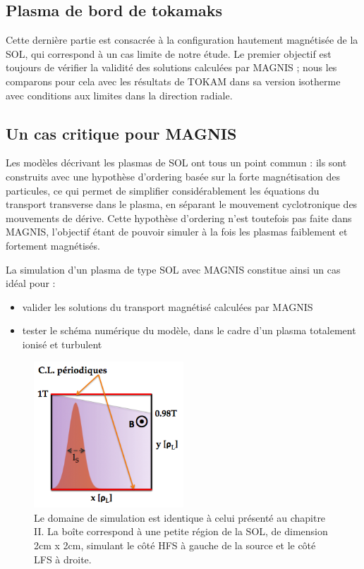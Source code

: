 \begin{refsection}
\section{Plasma de bord de tokamaks}

Cette dernière partie est consacrée à la configuration hautement magnétisée
de la SOL, qui correspond à un cas limite de notre étude. Le premier objectif
est toujours de vérifier la validité des solutions calculées par MAGNIS ; 
nous les comparons pour cela avec les résultats de
TOKAM dans sa version isotherme avec conditions aux limites dans la direction
radiale.

\subsection{Un cas critique pour MAGNIS}
Les modèles décrivant les plasmas de SOL ont tous un
point commun :
ils sont construits avec une hypothèse d'ordering basée sur la forte magnétisation des
particules, ce qui permet de simplifier considérablement les équations
du transport transverse dans le plasma, en séparant le mouvement cyclotronique
des mouvements de dérive.
Cette hypothèse d'ordering n'est
toutefois pas faite dans MAGNIS, l'objectif étant de pouvoir simuler à la
fois les plasmas faiblement et fortement magnétisés. 

La simulation d'un plasma de type SOL avec MAGNIS constitue ainsi un cas idéal
pour :

\begin{itemize}
  \item valider les solutions du transport magnétisé calculées par MAGNIS
  \item	tester le schéma numérique du modèle, dans le cadre d'un plasma
  totalement ionisé et turbulent
 \end{itemize}
  
\begin{figure}[!htbp]
\centering
\includegraphics[width=0.5\textwidth]{figures/4-tokamSimDomain.png}
\caption{Le domaine de simulation est identique à celui présenté au
chapitre II. La boîte correspond à une petite région de la SOL, de dimension
2cm x 2cm, simulant le côté HFS à gauche de la source et le côté LFS à droite.
\label{4-tokamSimDomain}}
\end{figure}


\end{refsection}
